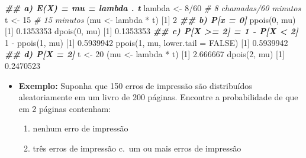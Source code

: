 \documentclass[
  10pt,
  a4paper]{book}
\newenvironment{Shaded}{\begin{snugshade}}{\end{snugshade}}
\newcommand{\AttributeTok}[1]{\textcolor[rgb]{0.77,0.63,0.00}{#1}}
\newcommand{\CommentTok}[1]{\textcolor[rgb]{0.56,0.35,0.01}{\textit{#1}}}
\newcommand{\ConstantTok}[1]{\textcolor[rgb]{0.00,0.00,0.00}{#1}}
\newcommand{\DecValTok}[1]{\textcolor[rgb]{0.00,0.00,0.81}{#1}}
\newcommand{\DocumentationTok}[1]{\textcolor[rgb]{0.56,0.35,0.01}{\textbf{\textit{#1}}}}
\newcommand{\FloatTok}[1]{\textcolor[rgb]{0.00,0.00,0.81}{#1}}
\newcommand{\FunctionTok}[1]{\textcolor[rgb]{0.00,0.00,0.00}{#1}}
\newcommand{\NormalTok}[1]{#1}
\newcommand{\OtherTok}[1]{\textcolor[rgb]{0.56,0.35,0.01}{#1}}
\newcommand{\SpecialCharTok}[1]{\textcolor[rgb]{0.00,0.00,0.00}{#1}}
\providecommand{\tightlist}{%
  \setlength{\itemsep}{0pt}\setlength{\parskip}{0pt}}
\begin{document}
\begin{Shaded}
\begin{Highlighting}[]
\DocumentationTok{\#\# a) E(X) = mu = lambda . t}
\NormalTok{lambda }\OtherTok{\textless{}{-}} \DecValTok{8}\SpecialCharTok{/}\DecValTok{60} \CommentTok{\# 8 chamadas/60 minutos}
\NormalTok{t }\OtherTok{\textless{}{-}} \DecValTok{15} \CommentTok{\# 15 minutos}
\NormalTok{(mu }\OtherTok{\textless{}{-}}\NormalTok{ lambda }\SpecialCharTok{*}\NormalTok{ t)}
\NormalTok{[}\DecValTok{1}\NormalTok{] }\DecValTok{2}
\DocumentationTok{\#\# b) P[x = 0]}
\FunctionTok{ppois}\NormalTok{(}\DecValTok{0}\NormalTok{, mu)}
\NormalTok{[}\DecValTok{1}\NormalTok{] }\FloatTok{0.1353353}
\FunctionTok{dpois}\NormalTok{(}\DecValTok{0}\NormalTok{, mu)}
\NormalTok{[}\DecValTok{1}\NormalTok{] }\FloatTok{0.1353353}
\DocumentationTok{\#\# c) P[X \textgreater{}= 2] = 1 {-} P[X \textless{} 2]}
\DecValTok{1} \SpecialCharTok{{-}} \FunctionTok{ppois}\NormalTok{(}\DecValTok{1}\NormalTok{, mu)}
\NormalTok{[}\DecValTok{1}\NormalTok{] }\FloatTok{0.5939942}
\FunctionTok{ppois}\NormalTok{(}\DecValTok{1}\NormalTok{, mu, }\AttributeTok{lower.tail =} \ConstantTok{FALSE}\NormalTok{)}
\NormalTok{[}\DecValTok{1}\NormalTok{] }\FloatTok{0.5939942}
\DocumentationTok{\#\# d) P[X = 2]}
\NormalTok{t }\OtherTok{\textless{}{-}} \DecValTok{20}
\NormalTok{(mu }\OtherTok{\textless{}{-}}\NormalTok{ lambda }\SpecialCharTok{*}\NormalTok{ t)}
\NormalTok{[}\DecValTok{1}\NormalTok{] }\FloatTok{2.666667}
\FunctionTok{dpois}\NormalTok{(}\DecValTok{2}\NormalTok{, mu)}
\NormalTok{[}\DecValTok{1}\NormalTok{] }\FloatTok{0.2470523}
\end{Highlighting}
\end{Shaded}

\begin{itemize}
\tightlist
\item
  \textbf{Exemplo:} Suponha que 150 erros de impressão são distribuídos aleatoriamente em um livro de 200 páginas. Encontre a probabilidade de que em 2 páginas contenham:

  \begin{enumerate}
  \def\labelenumi{\alph{enumi}.}
  \tightlist
  \item
    nenhum erro de impressão
  \item
    três erros de impressão
    c.~um ou mais erros de impressão
  \end{enumerate}
\end{itemize}
\end{document}
